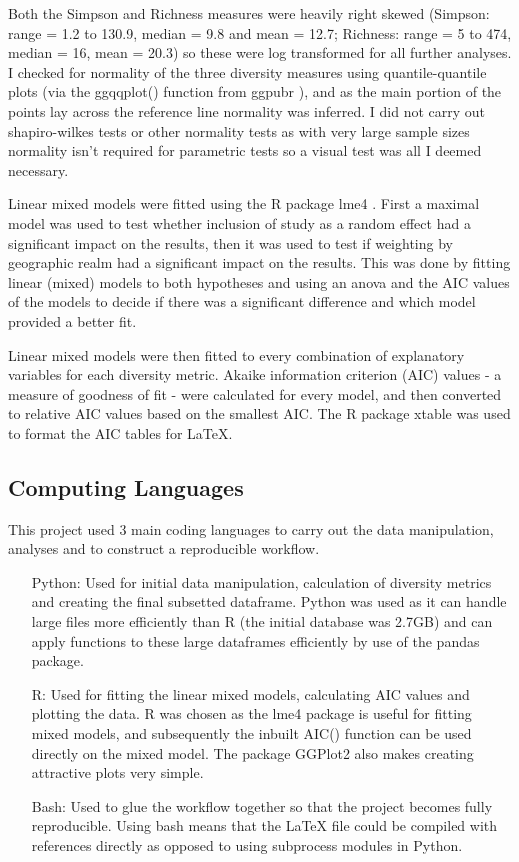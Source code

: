 \documentclass[11pt]{article}
\begin{document}
Both the Simpson and Richness measures were heavily right skewed (Simpson: range = 1.2 to 130.9, median = 9.8 and mean = 12.7; Richness: range = 5 to 474, median = 16, mean = 20.3) so these were log transformed for all further analyses. I checked for normality of the three diversity measures using quantile-quantile plots (via the ggqqplot() function from ggpubr \parencite{Kassambara2018}), and as the main portion of the points lay across the reference line normality was inferred. I did not carry out shapiro-wilkes tests or other normality tests as with very large sample sizes normality isn't required for parametric tests so a visual test was all I deemed necessary.

Linear mixed models were fitted using the R package lme4 \parencite{Bates2015}. First a maximal model was used to test whether inclusion of study as a random effect had a significant impact on the results, then it was used to test if weighting by geographic realm had a significant impact on the results. This was done by fitting linear (mixed) models to both hypotheses and using an anova and the AIC values of the models to decide if there was a significant difference and which model provided a better fit.

Linear mixed models were then fitted to every combination of explanatory variables for each diversity metric. Akaike information criterion (AIC) values \parencite{Akaike1974} - a measure of goodness of fit - were calculated for every model, and then converted to relative AIC values based on the smallest AIC. The R package xtable \parencite{Dahl2018} was used to format the AIC tables for \LaTeX{}.


\subsection{Computing Languages}
This project used 3 main coding languages to carry out the data manipulation, analyses and to construct a reproducible workflow.
\begin{itemize}[leftmargin=5em]
    \item[Python: ]Used for initial data manipulation, calculation of diversity metrics and creating the final subsetted dataframe. Python was used as it can handle large files more efficiently than R (the initial database was 2.7GB) and can apply functions to these large dataframes efficiently by use of the pandas package. 
    \item[R: ]Used for fitting the linear mixed models, calculating AIC values and plotting the data. R was chosen as the lme4 package is useful for fitting mixed models, and subsequently the inbuilt AIC() function can be used directly on the mixed model. The package GGPlot2 also makes creating attractive plots very simple.
    \item[Bash: ]Used to glue the workflow together so that the project becomes fully reproducible. Using bash means that the \LaTeX{} file could be compiled with references directly as opposed to using subprocess modules in Python.
\end{itemize}
\newpage
\end{document}

